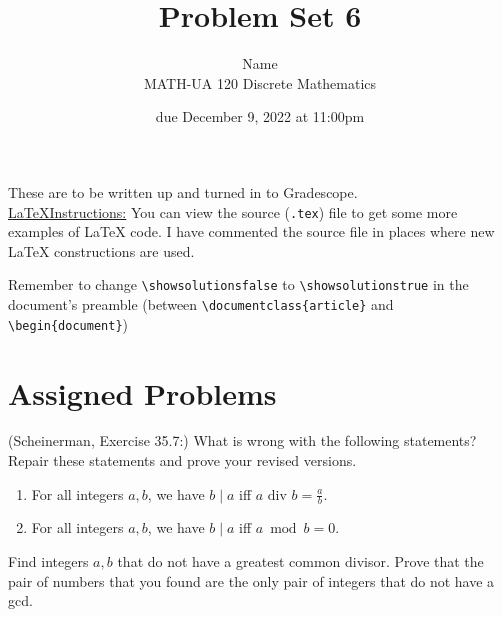 \documentclass{article}
\title{Problem Set 6}
\author{%
    Name
\\  MATH-UA 120 Discrete Mathematics
}
\date{due December 9, 2022 at 11:00pm}
\newif\ifshowsolutions
\newcommand{\danger}{\marginpar[\hfill\dbend]{\dbend\hfill}}
\newcommand{\divisor}{\text{ div }}
\theoremstyle{definition}
\begin{document}
\maketitle



These are to be written up and turned in to Gradescope.\\



\ifshowsolutions
    \SetupExSheets{solution/print=true}
\else
    \danger
 \underline{ \LaTeX  Instructions:}  You can view the source (\texttt{.tex}) file to get some more examples of \LaTeX{} code.  I have commented the source file in places where new \LaTeX{} constructions are used.
  
  Remember to change \verb|\showsolutionsfalse| to \verb|\showsolutionstrue|
    in the document's preamble 
    (between \verb|\documentclass{article}| and \verb|\begin{document}|)
\fi

\section*{Assigned Problems}



\begin{question}
    (Scheinerman, Exercise 35.7:)
    What is wrong with the following statements?  Repair these statements and prove your revised versions.
    \begin{enumerate}
	\item For all integers $a, b$, we have $b \mid a$ iff  $a \divisor b = \frac{a}{b}$.
	\item For all integers $a, b$, we have $b \mid a$ iff $a \bmod b = 0$.
    \end{enumerate}
\end{question}
\begin{solution}
\end{solution}

\begin{question}
    Find integers $a, b$ that do not have a greatest common divisor.  Prove that the pair of numbers that you found are the only pair of integers that do not have a gcd.
\end{question}
\begin{solution}
\end{solution}
\end{document}
